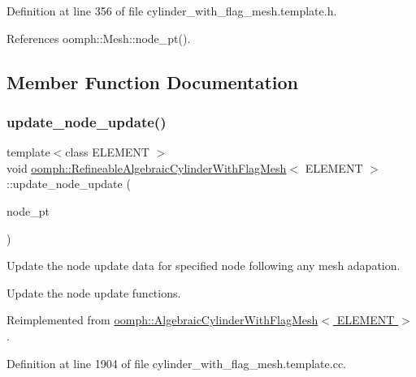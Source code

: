 Definition at line 356 of file cylinder\+\_\+with\+\_\+flag\+\_\+mesh.\+template.\+h.



References oomph\+::\+Mesh\+::node\+\_\+pt().



\subsection{Member Function Documentation}
\mbox{\label{classoomph_1_1RefineableAlgebraicCylinderWithFlagMesh_a186963cf4b1fc118929e49e012eba4d2}} 
\subsubsection{\texorpdfstring{update\+\_\+node\+\_\+update()}{update\_node\_update()}}
{\footnotesize\ttfamily template$<$class E\+L\+E\+M\+E\+NT $>$ \\
void \hyperlink{classoomph_1_1RefineableAlgebraicCylinderWithFlagMesh}{oomph\+::\+Refineable\+Algebraic\+Cylinder\+With\+Flag\+Mesh}$<$ E\+L\+E\+M\+E\+NT $>$\+::update\+\_\+node\+\_\+update (\begin{DoxyParamCaption}\item[{\hyperlink{classoomph_1_1AlgebraicNode}{Algebraic\+Node} $\ast$\&}]{node\+\_\+pt }\end{DoxyParamCaption})\hspace{0.3cm}{\ttfamily [virtual]}}



Update the node update data for specified node following any mesh adapation. 

Update the node update functions. 

Reimplemented from \hyperlink{classoomph_1_1AlgebraicCylinderWithFlagMesh_a9d909de1db84a3b7e42494535b152d92}{oomph\+::\+Algebraic\+Cylinder\+With\+Flag\+Mesh$<$ E\+L\+E\+M\+E\+N\+T $>$}.



Definition at line 1904 of file cylinder\+\_\+with\+\_\+flag\+\_\+mesh.\+template.\+cc.



